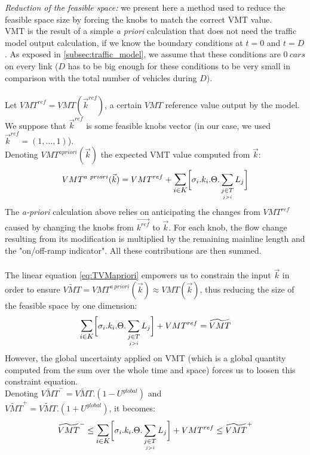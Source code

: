\emph{Reduction of the feasible space:} we present here a method used to reduce the feasible space size by forcing the knobs to match the correct VMT value.\\
VMT is the result of a simple \emph{a priori} calculation that does not need the traffic model output calculation, if we know the boundary conditions at $t=0$ and $t=D$. As exposed in \ref{subsec:traffic_model}, we assume that these conditions are $0\ cars$ on every link ($D$ has to be big enough for these conditions to be very small in comparison with the total number of vehicles during $D$).\\
\\
Let $VMT^{ref}=VMT(\vec{k}^{ref})$, a certain $VMT$ reference value output by the model. We suppose that $\vec{k}^{ref}$ is some feasible knobs vector (in our case, we used $\vec{k}^{ref}=(1,...,1)$).\\
Denoting $VMT^{a priori}(\vec{k})$ the expected VMT value computed from $\vec{k}$:\\
\begin{equation}
	\label{eq:TVMapriori}
	VMT^{a\ priori}(\vec{k})=VMT^{ref}+\mathlarger{\sum\limits_{i\in K}}\biggl[\sigma_{i}.k_{i}.\Theta.	\sum\limits_{\underset{j>i}{j\in T}}L_{j}\biggr]
\end{equation}	
The \emph{a-priori} calculation above relies on anticipating the changes from $VMT^{ref}$ caused by changing the knobs from $\vec{k^{ref}}$ to $\vec{k}$. For each knob, the flow change resulting from its modification is multiplied by the remaining mainline length and the "on/off-ramp indicator". All these contributions are then summed.\\
\\
The linear equation \ref{eq:TVMapriori} empowers us to constrain the input $\vec{k}$ in order to ensure $\widetilde{VMT}=VMT^{a\ priori}(\vec{k})\approx VMT(\vec{k})$, thus reducing the size of the feasible space by one dimension:
\begin{equation*}
	\mathlarger{\sum\limits_{i\in K}}\biggl[\sigma_{i}.k_{i}.\Theta.	\sum\limits_{\underset{j>i}{j\in T}}L_{j}\biggr]+VMT^{ref}=\widetilde{VMT}
\end{equation*}
However, the global uncertainty applied on VMT (which is a global quantity computed from the sum over the whole time and space) forces us to loosen this constraint equation.\\
Denoting $\widetilde{VMT}^{-}=\widetilde{VMT}.(1-U^{global})$ and\\ $\widetilde{VMT}^{+}=\widetilde{VMT}.(1+U^{global})$, it becomes:\\
\begin{equation}	
	\label{eq:TVMineq}
	\widetilde{VMT}^{-}\leq\mathlarger{\sum\limits_{i\in K}}\biggl[\sigma_{i}.k_{i}.\Theta.	\sum\limits_{\underset{j>i}{j\in T}}L_{j}\biggr]+VMT^{ref}\leq \widetilde{VMT}^{+}
\end{equation} 